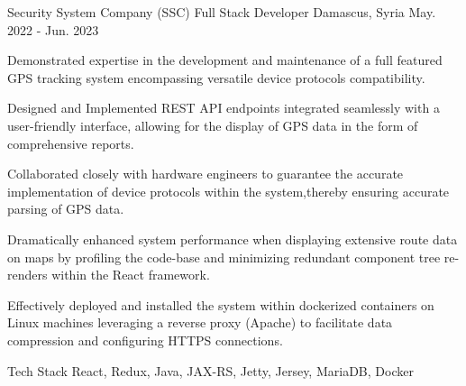 

\begin{cventries}

  \cventry
    {Security System Company (SSC)}  %
    {Full Stack Developer} %
    {Damascus, Syria} %
    {May. 2022 - Jun. 2023} %
    {
      \begin{cvitems} %
        \item {Demonstrated expertise in the development and maintenance of a full featured GPS tracking system encompassing versatile 
        device protocols compatibility.}
        \item {Designed and Implemented REST API endpoints integrated seamlessly with a user-friendly interface, allowing for the display of GPS data in the form of comprehensive reports.}
        \item {Collaborated closely with hardware engineers to guarantee the accurate implementation of device protocols within the system,thereby ensuring accurate parsing of GPS data.}
        \item {Dramatically enhanced system performance when displaying extensive route data on maps by profiling the code-base and minimizing redundant component tree re-renders within the React framework.}
        \item {Effectively deployed and installed the system within dockerized containers on Linux machines leveraging a reverse proxy (Apache) to facilitate data compression and configuring HTTPS connections.}
      \end{cvitems}
    }
    \begin{cventrytechstack}
        \cvtechstack
        {Tech Stack} %
        {React,  Redux,  Java,  JAX-RS,  Jetty,  Jersey,  MariaDB,    Docker} %
    \end{cventrytechstack}


\end{cventries}
